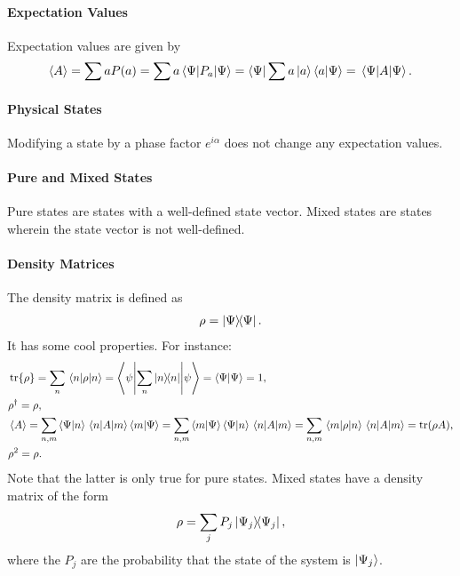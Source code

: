 \paragraph{Expectation Values}
Expectation values are given by
\begin{align*}
	\expval{A} = \sum aP(a) = \sum a\expval{P_{a}}{\Psi} = \bra{\Psi}\sum a\ket{a}\bra{a}\ket{\Psi} = \expval{A}{\Psi}.
\end{align*}

\paragraph{Physical States}
Modifying a state by a phase factor $e^{i\alpha}$ does not change any expectation values.

\paragraph{Pure and Mixed States}
Pure states are states with a well-defined state vector. Mixed states are states wherein the state vector is not well-defined.

\paragraph{Density Matrices}
The density matrix is defined as
\begin{align*}
	\rho = \op{\Psi}{\Psi}.
\end{align*}
It has some cool properties. For instance:
\begin{align*}
	&\tr{\rho} = \sum\limits_{n}\expval{\rho}{n} = \ev**{\sum\limits_{n}\op{n}{n}}{\psi} = \braket{\Psi} = 1, \\
	&\adj{\rho} = \rho, \\
	&\expval{A} = \sum\limits_{n, m}\braket{\Psi}{n}\mel{n}{A}{m}\braket{m}{\Psi} = \sum\limits_{n, m}\braket{m}{\Psi}\braket{\Psi}{n}\mel{n}{A}{m} = \sum\limits_{n, m}\mel{m}{\rho}{n}\mel{n}{A}{m} = \tr(\rho A), \\
	&\rho^{2} = \rho.
\end{align*}
Note that the latter is only true for pure states. Mixed states have a density matrix of the form
\begin{align*}
	\rho = \sum\limits_{j}P_{j}\op{\Psi_{j}}{\Psi_{j}},
\end{align*}
where the $P_{j}$ are the probability that the state of the system is $\ket{\Psi_{j}}$.

